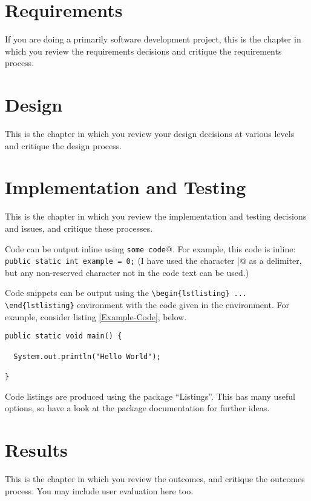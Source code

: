 \documentclass[11pt,openright,a4paper]{report}
\begin{document}

\chapter{Requirements}
If you are doing a primarily software development project, this is the
chapter in which you review the requirements decisions and
critique the requirements process.


\chapter{Design}
This is the chapter in which you review your design decisions at various
levels and critique the design process.


\chapter{Implementation and Testing}
This is the chapter in which you review the implementation and testing
decisions and issues, and critique these processes.

Code can be output inline using \verb@\lstinline|some code|@.  For example,
this code is inline: \lstinline|public static int example = 0;|  (I have
used the character \verb@|@ as a delimiter, but any non-reserved character
not in the code text can be used.)

Code snippets can be output using the \verb|\begin{lstlisting} ... \end{lstlisting}|
environment with the code given in the environment.  For
example, consider listing \ref{Example-Code}, below.

\begin{lstlisting}[breaklines,breakatwhitespace,caption={Example code},label=Example-Code]
public static void main() {

  System.out.println("Hello World");

}
\end{lstlisting}

Code listings are produced using the package ``Listings''.  This has many
useful options, so have a look at the package documentation for further
ideas.


\chapter{Results}
This is the chapter in which you review the outcomes, and
critique the outcomes process.  You may include user evaluation here
too.
\end{document}
